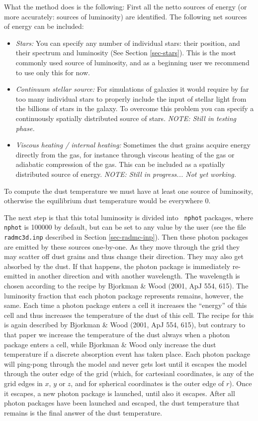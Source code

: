 \documentclass{report}
\begin{document}
What the method does is the following: First all the netto sources of energy
(or more accurately: sources of luminosity) are identified. The following
net sources of energy can be included:
\begin{itemize}
\item {\em Stars:} You can specify any number of individual stars: their
  position, and their spectrum and luminosity (See Section
  \ref{sec-stars}). This is the most commonly used source of luminosity, and
  as a beginning user we recommend to use only this for now.
\item {\em Continuum stellar source:} For simulations of galaxies it would
  require by far too many individual stars to properly include the input
  of stellar light from the billions of stars in the galaxy. To overcome
  this problem you can specify a continuously spatially distributed source
  of stars. {\em NOTE: Still in testing phase.}
\item {\em Viscous heating / internal heating:} Sometimes the dust grains
  acquire energy directly from the gas, for instance through viscous heating
  of the gas or adiabatic compression of the gas. This can be included as a
  spatially distributed source of energy. {\em NOTE: Still in
    progress... Not yet working.}
\end{itemize}
To compute the dust temperature we must have at least one source of
luminosity, otherwise the equilibrium dust temperature would be everywhere
0.

The next step is that this total luminosity is divided into {\small\tt
  nphot} packages, where {\small\tt nphot} is 100000 by default, but can be
set to any value by the user (see the file {\small\tt radmc3d.inp} described
in Section \ref{sec-radmc-inp}). Then these photon packages are emitted
by these sources one-by-one. As they move through the grid they may scatter
off dust grains and thus change their direction. They may also get absorbed
by the dust. If that happens, the photon package is immediately re-emitted
in another direction and with another wavelength. The wavelength is chosen
according to the recipe by Bjorkman \& Wood (2001, ApJ 554, 615). The
luminosity fraction that each photon package represents remains, however,
the same. Each time a photon package enters a cell it increases the
``energy'' of this cell and thus increases the temperature of the dust of
this cell.  The recipe for this is again described by Bjorkman \& Wood
(2001, ApJ 554, 615), but contrary to that paper we increase the temperature
of the dust always when a photon package enters a cell, while Bjorkman \&
Wood only increase the dust temperature if a discrete absorption event has
taken place. Each photon package will ping-pong through the model and never
gets lost until it escapes the model through the outer edge of the grid
(which, for cartesianl coordinates, is any of the grid edges in $x$, $y$ or
$z$, and for spherical coordinates is the outer edge of $r$). Once it
escapes, a new photon package is launched, until also it escapes. After all
photon packages have been launched and escaped, the dust temperature that
remains is the final answer of the dust temperature.
\end{document}
